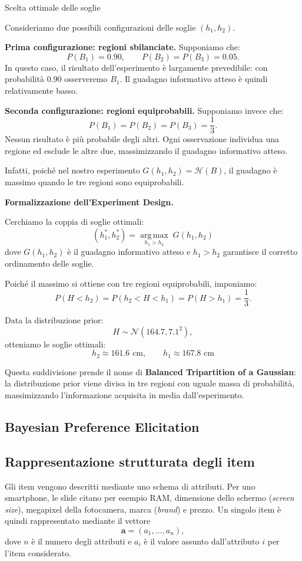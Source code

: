 \begin{observation}{Scelta ottimale delle soglie}

Consideriamo due possibili configurazioni delle soglie $(h_1,h_2)$.

\textbf{Prima configurazione: regioni sbilanciate.}
Supponiamo che:
\[
P(B_1)=0.90,\qquad P(B_2)=P(B_3)=0.05.
\]
In questo caso, il risultato dell'esperimento è largamente
prevedibile: con probabilità $0.90$ osserveremo $B_1$.
Il guadagno informativo atteso è quindi relativamente basso.

\textbf{Seconda configurazione: regioni equiprobabili.}
Supponiamo invece che:
\[
P(B_1)=P(B_2)=P(B_3)=\frac13.
\]
Nessun risultato è più probabile degli altri. Ogni osservazione
individua una regione ed esclude le altre due, massimizzando
il guadagno informativo atteso.

Infatti, poiché nel nostro esperimento $G(h_1,h_2)=\mathcal H(B)$,
il guadagno è massimo quando le tre regioni sono equiprobabili.

\medskip
\textbf{Formalizzazione dell'Experiment Design.}

Cerchiamo la coppia di soglie ottimali:
\[
\boxed{
(h_1^*,h_2^*)
=\underset{h_1>h_2}{\operatorname{arg\,max}}
\;G(h_1,h_2)
}
\]
dove $G(h_1,h_2)$ è il guadagno informativo atteso
e $h_1>h_2$ garantisce il corretto ordinamento delle soglie.

Poiché il massimo si ottiene con tre regioni equiprobabili,
imponiamo:
\[
P(H<h_2)=P(h_2<H<h_1)=P(H>h_1)=\frac13.
\]

Data la distribuzione prior:
\[
H\sim\mathcal N(164.7,7.1^2),
\]
otteniamo le soglie ottimali:
\[
\boxed{
h_2\approx161.6\text{ cm},
\qquad
h_1\approx167.8\text{ cm}
}
\]

Questa suddivisione prende il nome di
\textbf{Balanced Tripartition of a Gaussian}:
la distribuzione prior viene divisa in tre regioni
con uguale massa di probabilità, massimizzando
l'informazione acquisita in media dall'esperimento.

\end{observation}


\subsection{Bayesian Preference Elicitation}
\subsection{Rappresentazione strutturata degli item}
Gli item vengono descritti mediante uno schema di attributi. Per uno smartphone, le slide citano per esempio RAM, dimensione dello schermo (\emph{screen size}), megapixel della fotocamera, marca (\emph{brand}) e prezzo. Un singolo item è quindi rappresentato mediante il vettore
\[
\mathbf a=(a_1,\ldots,a_n),
\]
dove $n$ è il numero degli attributi e $a_i$ è il valore assunto dall'attributo $i$ per l'item considerato.

